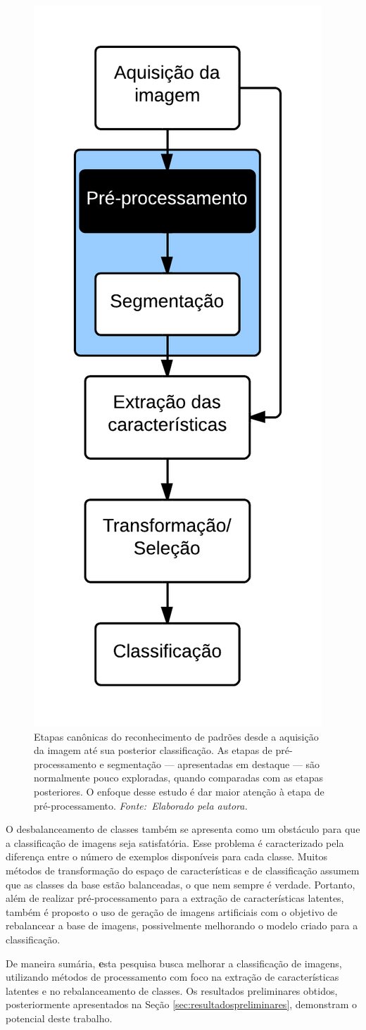 \begin{figure}[!ht]
 \begin{center}
   \includegraphics[width=0.3\linewidth]{figuras/flow.png}
 \end{center}
 \caption[Etapas canônicas do reconhecimento de padrões desde a aquisição da imagem até sua posterior classificação.]{Etapas canônicas do reconhecimento de padrões desde a aquisição da imagem até sua posterior classificação. As etapas de pré-processamento e segmentação --- apresentadas em destaque --- são normalmente pouco exploradas, quando comparadas com as etapas posteriores. O enfoque desse estudo é dar maior atenção à etapa de pré-processamento. \textit{Fonte:~Elaborado pela autora.}}
 \label{fig:fluxo}
\end{figure}

\enlargethispage{-\baselineskip}

O desbalanceamento de classes também se apresenta como um obstáculo para que a classificação de imagens seja satisfatória. Esse problema é caracterizado pela diferença entre o número de exemplos disponíveis para cada classe. Muitos métodos de transformação do espaço de características e de classificação assumem que as classes da base estão balanceadas, o que nem sempre é verdade. Portanto, além de realizar pré\hyp{}processamento para a extração de características latentes, também é proposto o uso de geração de imagens artificiais com o objetivo de rebalancear a base de imagens, possivelmente melhorando o modelo criado para a classificação.

De maneira sumária, {\textbf esta pesquisa busca melhorar a classificação de imagens, utilizando métodos de processamento com foco na extração de características latentes e no rebalanceamento de classes.} Os resultados preliminares obtidos, posteriormente apresentados na Seção \ref{sec:resultadospreliminares}, demonstram o potencial deste trabalho.

